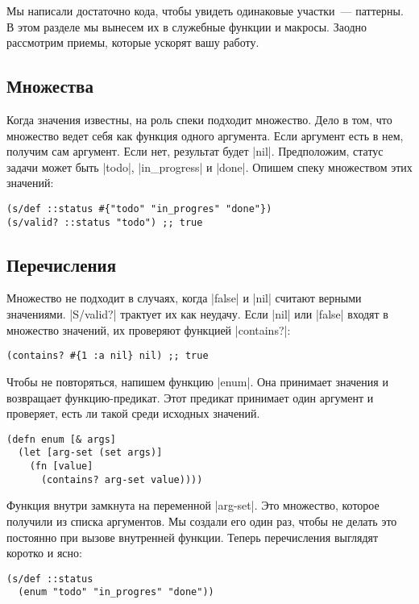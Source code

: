 Мы написали достаточно кода, чтобы увидеть одинаковые участки~--- паттерны. В
этом разделе мы вынесем их в служебные функции и макросы. Заодно рассмотрим
приемы, которые ускорят вашу работу.

\subsection{Множества}

Когда значения известны, на роль спеки подходит множество. Дело в том, что
множество ведет себя как функция одного аргумента. Если аргумент есть в нем,
получим сам аргумент. Если нет, результат будет \spverb|nil|. Предположим,
статус задачи может быть \spverb|todo|, \spverb|in_progress| и
\spverb|done|. Опишем спеку множеством этих значений:

\begin{verbatim}
(s/def ::status #{"todo" "in_progres" "done"})
(s/valid? ::status "todo") ;; true
\end{verbatim}

\subsection{Перечисления}

Множество не подходит в случаях, когда \spverb|false| и \spverb|nil| считают
верными значениями. \spverb|S/valid?| трактует их как неудачу. Если \spverb|nil|
или \spverb|false| входят в множество значений, их проверяют функцией
\spverb|contains?|:

\begin{verbatim}
(contains? #{1 :a nil} nil) ;; true
\end{verbatim}

Чтобы не повторяться, напишем функцию \spverb|enum|. Она принимает значения и
возвращает функцию-предикат. Этот предикат принимает один аргумент и проверяет,
есть ли такой среди исходных значений.

\begin{verbatim}
(defn enum [& args]
  (let [arg-set (set args)]
    (fn [value]
      (contains? arg-set value))))
\end{verbatim}

Функция внутри замкнута на переменной \spverb|arg-set|. Это множество, которое
получили из списка аргументов. Мы создали его один раз, чтобы не делать это
постоянно при вызове внутренней функции. Теперь перечисления выглядят коротко и
ясно:

\begin{verbatim}
(s/def ::status
  (enum "todo" "in_progres" "done"))
\end{verbatim}

